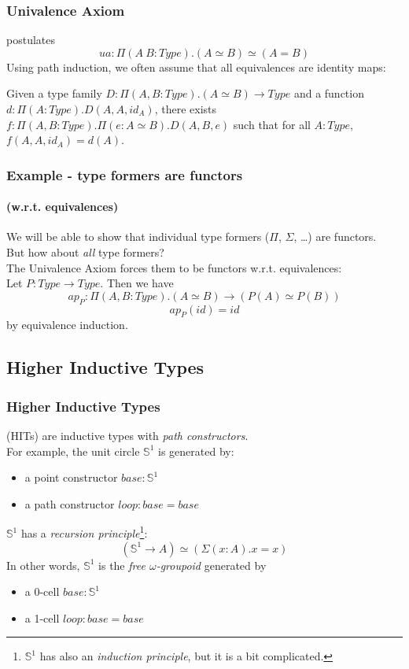 \documentclass[dvipdfmx]{beamer}
\begin{document}
\begin{frame}
  \frametitle{Univalence Axiom}
  postulates
  \[
    ua : \Pi \left( A \ B : Type \right) .
    \left( A \simeq B \right) \simeq \left( A = B \right)
  \]
  Using path induction,
  we often assume that all equivalences are identity maps:

  \begin{theorem}
    Given a type family
    $D : \Pi \left( A , B : Type \right) . \left( A \simeq B \right)
    \to Type$ and a function
    $d : \Pi \left( A : Type \right) . D \left( A , A , id_A \right)$,
    there exists
    $f : \Pi \left( A , B : Type \right) .
    \Pi \left( e : A \simeq B \right) .
    D \left( A , B , e \right)$ such that
    for all $A : Type$,
    $f \left( A , A , id_A \right) = d \left( A \right)$.
  \end{theorem}
\end{frame}

\begin{frame}
  \frametitle{Example - type formers are functors}
  \framesubtitle{(w.r.t. equivalences)}
  We will be able to show that
  individual type formers ($\Pi$, $\Sigma$, \dots) are functors.
  \\
  But how about {\it all} type formers?
  \\
  The Univalence Axiom forces them to be functors w.r.t. equivalences:
  \\
  Let $P : Type \to Type$.
  Then we have
  \[
    ap_P : \Pi \left( A , B : Type \right) .
    \left( A \simeq B \right) \to
    \left( P \left( A \right) \simeq P \left( B \right) \right)
  \]
  \[
    ap_P \left( id \right) = id
  \]
  by equivalence induction.
\end{frame}

\subsection{Higher Inductive Types}

\begin{frame}
  \frametitle{Higher Inductive Types}
  (HITs) are inductive types with {\it path constructors}. \\
  For example, the unit circle ${\mathbb S}^1$ is generated by:
  \begin{itemize}
    \item a point constructor $base : {\mathbb S}^1$
    \item a path constructor $loop : base = base$
  \end{itemize}
  ${\mathbb S}^1$ has a {\it recursion principle}\footnote{
    ${\mathbb S}^1$ has also an {\it induction principle},
    but it is a bit complicated.}:
  \[
    \left( {\mathbb S}^1 \to A \right) \simeq
    \left( \Sigma \left( x : A \right) . x = x \right)
  \]
  In other words, ${\mathbb S}^1$ is the {\it free $\omega$-groupoid}
  generated by
  \begin{itemize}
    \item a 0-cell $base : {\mathbb S}^1$
    \item a 1-cell $loop : base = base$
  \end{itemize}
\end{frame}
\end{document}
